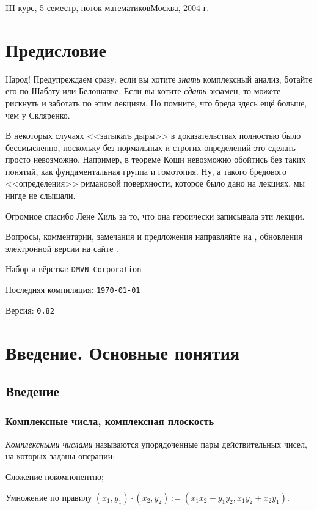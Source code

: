 \documentclass[a4paper]{article}
\begin{document}
{III курс, 5 семестр, поток математиков}{Москва, 2004 г.}
\pagebreak

\tableofcontents

\pagebreak

\section*{Предисловие}

Народ! Предупреждаем сразу: если вы хотите \emph{знать} комплексный анализ,
ботайте его по Шабату или Белошапке. Если вы хотите \emph{сдать} экзамен,
то можете рискнуть и заботать по этим лекциям.
Но помните, что бреда здесь ещё больше, чем у Скляренко.

В некоторых случаях <<затыкать дыры>> в доказательствах полностью было бессмысленно, поскольку без
нормальных и строгих определений это сделать просто невозможно. Например, в теореме Коши
невозможно обойтись без таких понятий, как фундаментальная группа и гомотопия. Ну, а такого
бредового <<определения>> римановой поверхности, которое было дано на лекциях, мы нигде
не слышали.

Огромное спасибо Лене Хиль за то, что она героически записывала эти лекции.

Вопросы, комментарии, замечания и предложения направляйте на \dmvnmail{}, обновления
электронной версии на сайте \dmvnwebsite{}.

\hfill Набор и вёрстка: \texttt{DMVN Corporation}

\hfill Последняя компиляция: \texttt{\today}

\hfill Версия: \texttt{0.82}

\pagebreak

\section{Введение. Основные понятия}

\subsection{Введение}

\subsubsection{Комплексные числа, комплексная плоскость}

\begin{df}
\emph{Комплексными числами} называются упорядоченные пары действительных чисел, на которых заданы операции:

\begin{points}{-2}
\item Сложение покомпонентно;
\item Умножение по правилу $(x_1, y_1)\cdot(x_2, y_2) := (x_1x_2 - y_1 y_2, x_1y_2 + x_2y_1)$.
\end{points}
\end{df}
\end{document}

